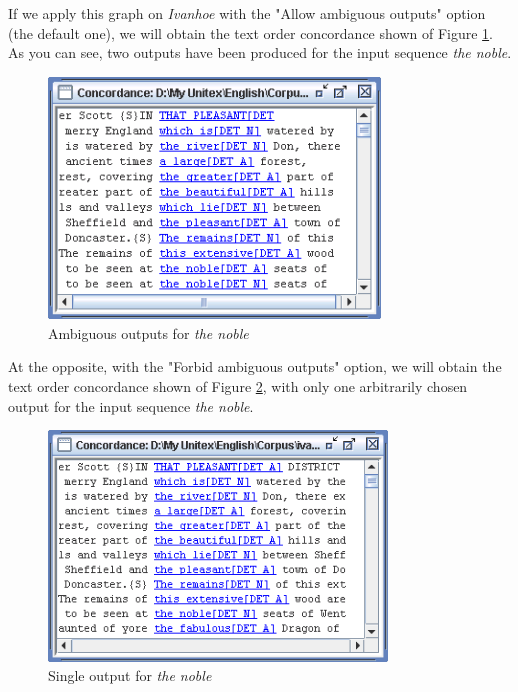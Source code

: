 \noindent If we apply this graph on \textit{Ivanhoe} with the "Allow ambiguous
outputs" option (the default one), we will obtain the text order
concordance shown of Figure \ref{fig6-advanced-options3}. As you can see, two
outputs have been produced for the input sequence \textit{the noble}.

\bigskip
\begin{figure}[!h]
\begin{center}
\includegraphics[width=8.8cm]{resources/img/fig6-advanced-options3.png}
\caption{Ambiguous outputs for \textit{the noble}\label{fig6-advanced-options3}}
\end{center}
\end{figure}


\noindent At the opposite, with the "Forbid ambiguous
outputs" option, we will obtain the text order
concordance shown of Figure \ref{fig6-advanced-options4}, with only one
arbitrarily chosen output for the input sequence \textit{the noble}.

\bigskip
\begin{figure}[!h]
\begin{center}
\includegraphics[width=9cm]{resources/img/fig6-advanced-options4.png}
\caption{Single output for \textit{the noble}\label{fig6-advanced-options4}}
\end{center}
\end{figure}


